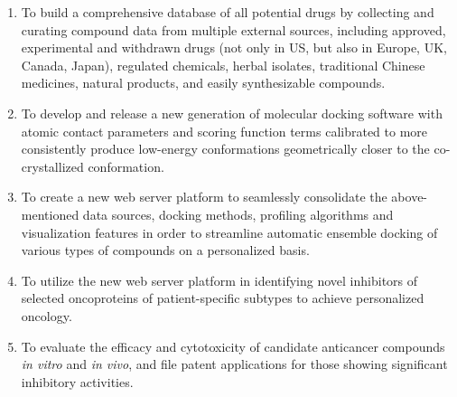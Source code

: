 \documentclass[a4paper,12pt]{article}
\begin{document}
\begin{enumerate}
  \item To build a comprehensive database of all potential drugs by collecting and curating compound data from multiple external sources, including approved, experimental and withdrawn drugs (not only in US, but also in Europe, UK, Canada, Japan), regulated chemicals, herbal isolates, traditional Chinese medicines, natural products, and easily synthesizable compounds.\label{objective:cdata}
  \item To develop and release a new generation of molecular docking software with atomic contact parameters and scoring function terms calibrated to more consistently produce low-energy conformations geometrically closer to the co-crystallized conformation.\label{objective:idock}
  \item To create a new web server platform to seamlessly consolidate the above-mentioned data sources, docking methods, profiling algorithms and visualization features in order to streamline automatic ensemble docking of various types of compounds on a personalized basis.\label{objective:edock}
  \item To utilize the new web server platform in identifying novel inhibitors of selected oncoproteins of patient-specific subtypes to achieve personalized oncology.\label{objective:edockapp}
  \item To evaluate the efficacy and cytotoxicity of candidate anticancer compounds \textit{in vitro} and \textit{in vivo}, and file patent applications for those showing significant inhibitory activities.\label{objective:wetval}
\end{enumerate}
\end{document}
